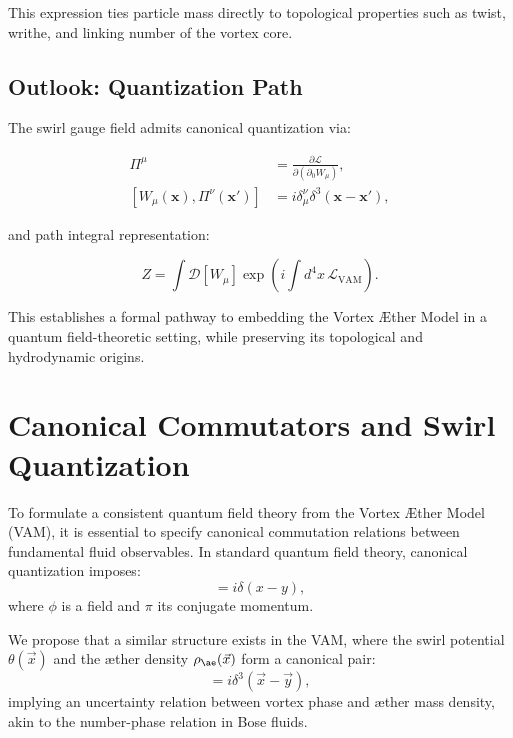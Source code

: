 This expression ties particle mass directly to topological properties such as twist, writhe, and linking number of the vortex core.

\subsection{Outlook: Quantization Path}

The swirl gauge field admits canonical quantization via:

\begin{align}
\Pi^\mu &= \frac{\partial \mathcal{L}}{\partial (\partial_0 W_\mu)}, \\
[W_\mu(\mathbf{x}), \Pi^\nu(\mathbf{x}')] &= i \delta^\nu_\mu \delta^3(\mathbf{x} - \mathbf{x}'),
\end{align}

and path integral representation:

\begin{equation}
Z = \int \mathcal{D}[W_\mu] \exp\left(i \int d^4x \, \mathcal{L}_{\text{VAM}}\right).
\end{equation}

This establishes a formal pathway to embedding the Vortex Æther Model in a quantum field-theoretic setting, while preserving its topological and hydrodynamic origins.

\section{Canonical Commutators and Swirl Quantization}

To formulate a consistent quantum field theory from the Vortex Æther Model (VAM), it is essential to specify canonical commutation relations between fundamental fluid observables. In standard quantum field theory, canonical quantization imposes:
\begin{equation}
[\phi(x), \pi(y)] = i \delta(x - y),
\end{equation}
where $\phi$ is a field and $\pi$ its conjugate momentum.

We propose that a similar structure exists in the VAM, where the swirl potential $\theta(\vec{x})$ and the æther density $\rho_{\ae}(\vec{x})$ form a canonical pair:
\begin{equation}
[\theta(\vec{x}), \rho_{\ae}(\vec{y})] = i \delta^3(\vec{x} - \vec{y}),
\end{equation}
implying an uncertainty relation between vortex phase and æther mass density, akin to the number-phase relation in Bose fluids.

